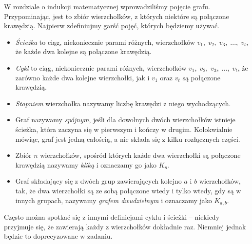

\noindent
W rozdziale o indukcji matematycznej wprowadziliśmy pojęcie grafu. Przypominając, jest to zbiór wierzchołków, z których niektóre są połączone krawędzią. Najpierw zdefiniujmy garść pojęć, których będziemy używać.

\vspace{5px}


\noindent
\begin{itemize}
    \item \textit{Ścieżka} to ciąg, niekoniecznie parami różnych, wierzchołków $v_1, \; v_2, \; v_3, \; ..., \; v_t$, że każde dwa kolejne są połączone krawędzią.
    \item \textit{Cykl} to ciąg, niekoniecznie parami różnych, wierzchołków $v_1, \; v_2, \; v_3, \; ..., \; v_t$, że zarówno każde dwa kolejne wierzchołki, jak i $v_1$ oraz $v_t$ są połączone krawędzią. 
    \item \textit{Stopniem} wierzchołka nazywamy liczbę krawędzi z niego wychodzących.
    \item Graf nazywamy \textit{spójnym}, jeśli dla dowolnych dwóch wierzchołków istnieje ścieżka, która zaczyna się w pierwszym i kończy w drugim. Kolokwialnie mówiąc, graf jest jedną całością, a nie składa się z kilku rozłącznych części.
    \item Zbiór $n$ wierzchołków, spośród których każde dwa wierzchołki są połączone krawędzią nazywamy \textit{kliką} i oznaczamy go jako $K_n$.
    \item Graf składający się z dwóch grup zawierających kolejno $a$ i $b$ wierzchołków, tak, że dwa wierzchołki są ze sobą połączone wtedy i tylko wtedy, gdy są w innych grupach, nazywamy \textit{grafem dwudzielnym} i oznaczamy jako $K_{a, b}$.
\end{itemize}

\begin{remark}
    Często można spotkać się z innymi definicjami cyklu i ścieżki -- niekiedy przyjmuje się, że zawierają każdy z wierzchołków dokładnie raz. Niemniej jednak będzie to doprecyzowane w zadaniu.
\end{remark}

